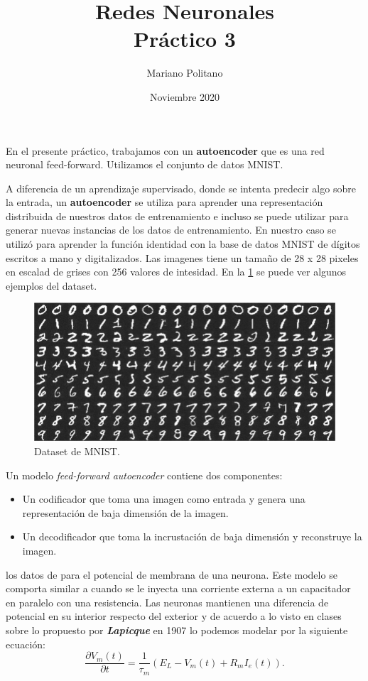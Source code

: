 \documentclass{article}
\title{Redes Neuronales \\
  \large Práctico 3 \\
  }
\author{Mariano Politano }
\date{Noviembre 2020}
\begin{document}
\maketitle




En el presente práctico, trabajamos con un  \textbf{autoencoder} que es una red neuronal feed-forward. Utilizamos el conjunto de datos MNIST.

A diferencia de un aprendizaje supervisado, donde se intenta predecir algo sobre la entrada, un \textbf{autoencoder} se utiliza para aprender una representación distribuida de nuestros datos de entrenamiento e incluso se puede utilizar para generar nuevas instancias de los datos de entrenamiento. 
En nuestro caso se utilizó para aprender la función identidad con la base de datos MNIST de dígitos escritos a mano y digitalizados.
Las imagenes tiene un tamaño de 28 x 28 pixeles en escalad de grises con 256 valores de intesidad.
En la \ref{fig1} se puede ver algunos ejemplos del dataset.
\begin{figure}[H]
\centering
\includegraphics[width=\textwidth]{example.png}
\caption{Dataset de MNIST.}
\label{fig1}
\end{figure}



Un modelo \textit{feed-forward autoencoder} contiene dos componentes:

\begin{itemize}
\item Un codificador que toma una imagen como entrada y genera una representación de baja dimensión de la imagen.
\item Un decodificador que toma la incrustación de baja dimensión y reconstruye la imagen. 
\end{itemize}






los datos de  para el potencial de membrana de una neurona. Este modelo se comporta similar a cuando se le inyecta una corriente externa a un capacitador en paralelo con una resistencia.  Las neuronas mantienen una diferencia de potencial en su interior respecto del exterior y de acuerdo a lo  visto en clases sobre lo propuesto por \textbf{\textit{Lapicque}} en 1907 lo podemos  modelar  por la siguiente ecuación:
\begin{equation}
\label{eq1}
\frac{\partial V_{m}(t)}{\partial t} = \frac{1}{\tau_{m}}(E_{L} - V_{m}(t) + R_{m}I_{e}(t)).
\end{equation}
\
\end{document}
